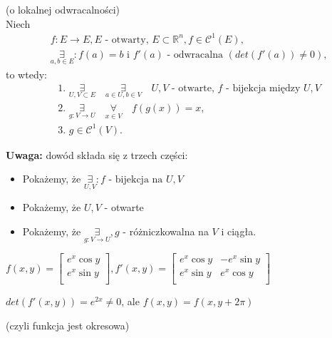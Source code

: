 \documentclass[../main.tex]{subfiles}
\begin{document}
\begin{tw}
    (o lokalnej odwracalności)\\
    Niech
    \begin{align*}
        &f: E \to E, E\text{ - otwarty, } E\subset \mathbb{R}^n,f \in \mathcal{C}^1 (E), \\
        &\underset{a,b\in E}{\exists}:f(a) = b \text{ i } f'(a) \text{ - odwracalna } (det(f'(a))\neq 0),
    \end{align*}
        to wtedy:
    \begin{align*}
        &\text{1. } \underset{U,V\subset E}{\exists}\quad \underset{a\in U, b\in V}{\exists}\quad U,V \text{ - otwarte, }f \text{ - bijekcja między } U,V\\
        &\text{2. } \underset{g: V\to U}{\exists}\quad \underset{x\in V}{\forall}\quad f(g(x)) = x,\\
        &\text{3. } g \in \mathcal{C}^1(V).
    \end{align*}
\end{tw}
\textbf{Uwaga:}
dowód składa się z trzech części:
\begin{itemize}
    \item Pokażemy, że $\underset{U,V}{\exists}: f \text{ - bijekcja na }U,V$
    \item Pokażemy, że $U,V$ - otwarte
    \item Pokażemy, że $\underset{g: V\to U}{\exists}, g$ - różniczkowalna na $V$ i ciągła.
\end{itemize}

\begin{przyklad}
$f(x,y) = \left [ \begin{matrix}
e^x \cos y\\
e^x \sin y\\ \end{matrix}\right ]
,
f'(x,y) = \left [ \begin{matrix}
e^x \cos y &-e^x \sin y\\
e^x \sin y &e^x \cos y\\
 \end{matrix}\right ] $

$det(f'(x,y)) = e^{2x} \neq 0$, ale $f(x,y) = f(x,y+2\pi)$
\begin{tiny}
(czyli funkcja jest okresowa)
\end{tiny}
\end{przyklad}
\end{document}
